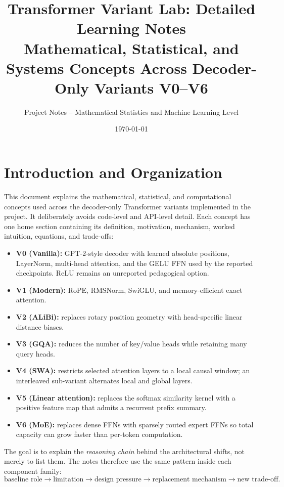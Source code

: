 \documentclass[11pt,a4paper]{article}
\title{\textbf{Transformer Variant Lab: Detailed Learning Notes}\\[0.5em]
\large Mathematical, Statistical, and Systems Concepts Across Decoder-Only Variants V0--V6}
\author{Project Notes -- Mathematical Statistics and Machine Learning Level}
\date{\today}
\theoremstyle{definition}
\theoremstyle{plain}
\begin{document}
\maketitle
\tableofcontents
\newpage

\section{Introduction and Organization}

This document explains the mathematical, statistical, and computational concepts used across the decoder-only Transformer variants implemented in the project. It deliberately avoids code-level and API-level detail. Each concept has one home section containing its definition, motivation, mechanism, worked intuition, equations, and trade-offs:
\begin{itemize}
    \item \textbf{V0 (Vanilla):} GPT-2-style decoder with learned absolute positions, LayerNorm, multi-head attention, and the GELU FFN used by the reported checkpoints. ReLU remains an unreported pedagogical option.
    \item \textbf{V1 (Modern):} RoPE, RMSNorm, SwiGLU, and memory-efficient exact attention.
    \item \textbf{V2 (ALiBi):} replaces rotary position geometry with head-specific linear distance biases.
    \item \textbf{V3 (GQA):} reduces the number of key/value heads while retaining many query heads.
    \item \textbf{V4 (SWA):} restricts selected attention layers to a local causal window; an interleaved sub-variant alternates local and global layers.
    \item \textbf{V5 (Linear attention):} replaces the softmax similarity kernel with a positive feature map that admits a recurrent prefix summary.
    \item \textbf{V6 (MoE):} replaces dense FFNs with sparsely routed expert FFNs so total capacity can grow faster than per-token computation.
\end{itemize}

The goal is to explain the \emph{reasoning chain} behind the architectural shifts, not merely to list them. The notes therefore use the same pattern inside each component family:
\begin{equation*}
    \text{baseline role}
    \rightarrow
    \text{limitation}
    \rightarrow
    \text{design pressure}
    \rightarrow
    \text{replacement mechanism}
    \rightarrow
    \text{new trade-off}.
\end{equation*}
\end{document}
